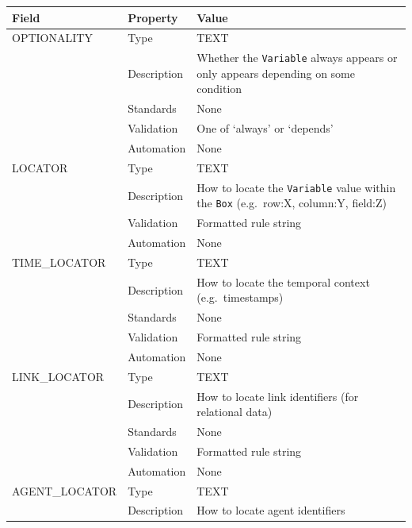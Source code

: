 \documentclass[
]{article}
\newcounter{none}
\begin{document}
{\def\LTcaptype{none} 
\begin{longtable}[]{@{}
  >{\raggedright\arraybackslash}p{}
  >{\raggedright\arraybackslash}p{}
  >{\raggedright\arraybackslash}p{}@{}}
\toprule\noalign{}
\begin{minipage}[b]{\linewidth}\raggedright
Field
\end{minipage} & \begin{minipage}[b]{\linewidth}\raggedright
Property
\end{minipage} & \begin{minipage}[b]{\linewidth}\raggedright
Value
\end{minipage} \\
\midrule\noalign{}
\endhead
\bottomrule\noalign{}
\endlastfoot
OPTIONALITY & Type & TEXT \\
& Description & Whether the \texttt{Variable} always appears or only
appears depending on some condition \\
& Standards & None \\
& Validation & One of `always' or `depends' \\
& Automation & None \\
LOCATOR & Type & TEXT \\
& Description & How to locate the \texttt{Variable} value within the
\texttt{Box} (e.g.~row:X, column:Y, field:Z) \\
& Validation & Formatted rule string \\
& Automation & None \\
TIME\_LOCATOR & Type & TEXT \\
& Description & How to locate the temporal context (e.g.~timestamps) \\
& Standards & None \\
& Validation & Formatted rule string \\
& Automation & None \\
LINK\_LOCATOR & Type & TEXT \\
& Description & How to locate link identifiers (for relational data) \\
& Standards & None \\
& Validation & Formatted rule string \\
& Automation & None \\
AGENT\_LOCATOR & Type & TEXT \\
& Description & How to locate agent identifiers \\

\end{longtable}}
\end{document}
